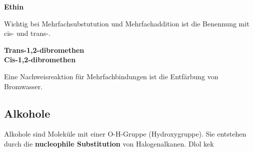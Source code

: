 \documentclass[a4paper]{article}
\begin{document}
\begin{center}
     \hspace{1cm} \textbf{Ethin}\\[0,5cm]
\end{center}

Wichtig bei Mehrfachsubstutution und Mehrfachaddition ist die Benennung mit cis- und trans-.\\
\begin{center}
     \hspace{1cm} \textbf{Trans-1,2-dibromethen}\\[0,5cm]
     \hspace{1cm} \textbf{Cis-1,2-dibromethen}\\[0,5cm]
\end{center}

Eine Nachweisreaktion für Mehrfachbindungen ist die Entfärbung von Bromwasser.


\subsection{Alkohole}

Alkohole sind Moleküle mit einer O-H-Gruppe (Hydroxygruppe). Sie entstehen durch die
\textbf{nucleophile Substitution} von Halogenalkanen.
Dlol kek
\end{document}

